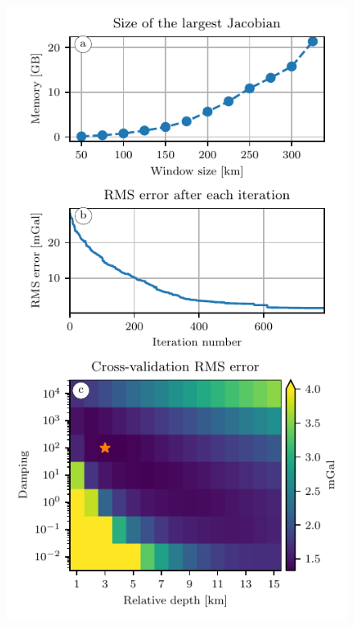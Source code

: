 \begin{figure}[tbh!]
    \makeatletter%
    \if@twocolumn%
        \includegraphics[width=\linewidth]{eql-gradient-boosted/figs/australia-memory-cv-error.pdf}
    \else%
        \centering

\end{figure}
